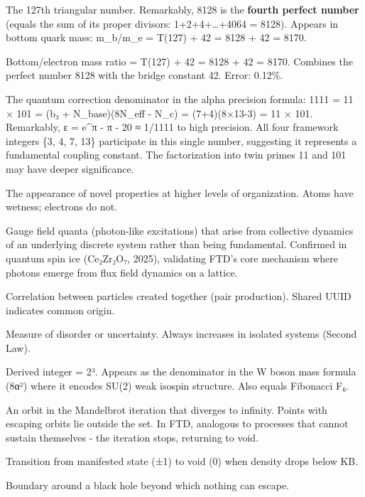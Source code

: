 \documentclass[
  11pt,
  letterpaper,
  twoside,
  openright]{book}
\begin{document}
\begin{description}
The 127th triangular number. Remarkably, 8128 is the \textbf{fourth
perfect number} (equals the sum of its proper divisors:
1+2+4+\ldots+4064 = 8128). Appears in bottom quark mass: m\_b/m\_e =
T(127) + 42 = 8128 + 42 = 8170.
\item[\textbf{Eight Thousand One Hundred Seventy (8170)}]
Bottom/electron mass ratio = T(127) + 42 = 8128 + 42 = 8170. Combines
the perfect number 8128 with the bridge constant 42. Error: 0.12\%.
\item[\textbf{Eleven Hundred Eleven (1111)}]
The quantum correction denominator in the alpha precision formula: 1111
= 11 × 101 = (b₃ + N\_base)(8N\_eff - N\_c) = (7+4)(8×13-3) = 11 × 101.
Remarkably, \textbar ε\textbar{} = \textbar e\^{}π - π - 20\textbar{} ≈
1/1111 to high precision. All four framework integers \{3, 4, 7, 13\}
participate in this single number, suggesting it represents a
fundamental coupling constant. The factorization into twin primes 11 and
101 may have deeper significance.
\item[\textbf{Emergence}]
The appearance of novel properties at higher levels of organization.
Atoms have wetness; electrons do not.
\item[\textbf{Emergent Gauge Bosons}]
Gauge field quanta (photon-like excitations) that arise from collective
dynamics of an underlying discrete system rather than being fundamental.
Confirmed in quantum spin ice (Ce₂Zr₂O₇, 2025), validating FTD's core
mechanism where photons emerge from flux field dynamics on a lattice.
\item[\textbf{Entanglement}]
Correlation between particles created together (pair production). Shared
UUID indicates common origin.
\item[\textbf{Entropy}]
Measure of disorder or uncertainty. Always increases in isolated systems
(Second Law).
\item[\textbf{Eight (8 = 2\^{}N\_c)}]
Derived integer = 2³. Appears as the denominator in the W boson mass
formula (8α²) where it encodes SU(2) weak isospin structure. Also equals
Fibonacci F₆.
\item[\textbf{Escaping Orbit (Mandelbrot)}]
An orbit in the Mandelbrot iteration that diverges to infinity. Points
with escaping orbits lie outside the set. In FTD, analogous to processes
that cannot sustain themselves - the iteration stops, returning to void.
\item[\textbf{Evaporation}]
Transition from manifested state (±1) to void (0) when density drops
below KB.
\item[\textbf{Event Horizon}]
Boundary around a black hole beyond which nothing can escape.
\end{description}
\end{document}
